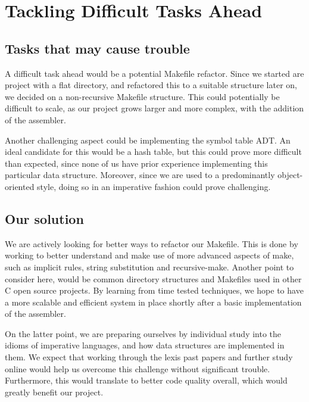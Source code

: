 \documentclass[a4paper]{article}
\begin{document}
\section{Tackling Difficult Tasks Ahead}
\subsection{Tasks that may cause trouble}
A difficult task ahead would be a potential Makefile refactor. Since we started are project with a flat directory, and refactored this to a suitable structure later on, we decided on a non-recursive Makefile structure. This could potentially be difficult to scale, as our project grows larger and more complex, with the addition of the assembler.

Another challenging aspect could be implementing the symbol table ADT. An ideal candidate for this would be a hash table, but this could prove more difficult than expected, since none of us have prior experience implementing this particular data structure. Moreover, since we are used to a predominantly object-oriented style, doing so in an imperative fashion could prove challenging.

\subsection{Our solution}
We are actively looking for better ways to refactor our Makefile. This is done by working to better understand and make use of more advanced aspects of make, such as implicit rules, string substitution and recursive-make. Another point to consider here, would be common directory structures and Makefiles used in other C open source projects. By learning from time tested techniques, we hope to have a more scalable and efficient system in place shortly after a basic implementation of the assembler.

On the latter point, we are preparing ourselves by individual study into the idioms of imperative languages, and how data structures are implemented in them. We expect that working through the lexis past papers and further study online would help us overcome this challenge without significant trouble. Furthermore, this would translate to better code quality overall, which would greatly benefit our project.
\end{document}
